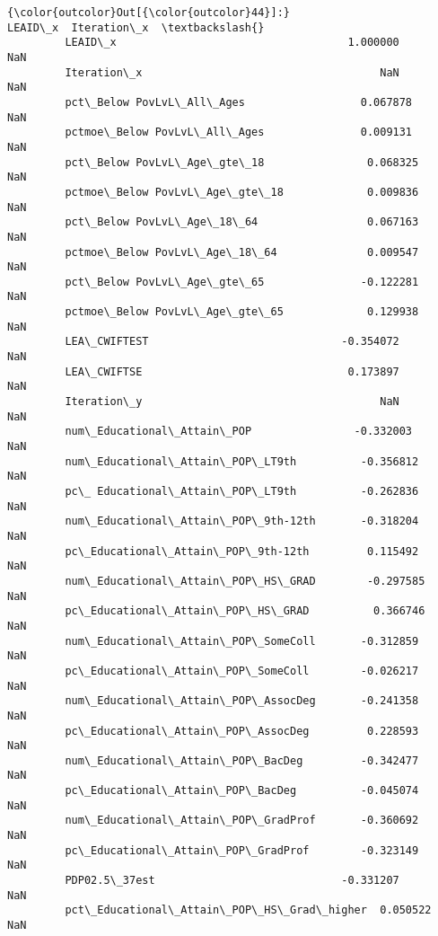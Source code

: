 \documentclass[11pt]{article}
\begin{document}
\begin{Verbatim}[commandchars=\\\{\}]
{\color{outcolor}Out[{\color{outcolor}44}]:}                                             LEAID\_x  Iteration\_x  \textbackslash{}
         LEAID\_x                                    1.000000          NaN   
         Iteration\_x                                     NaN          NaN   
         pct\_Below PovLvL\_All\_Ages                  0.067878          NaN   
         pctmoe\_Below PovLvL\_All\_Ages               0.009131          NaN   
         pct\_Below PovLvL\_Age\_gte\_18                0.068325          NaN   
         pctmoe\_Below PovLvL\_Age\_gte\_18             0.009836          NaN   
         pct\_Below PovLvL\_Age\_18\_64                 0.067163          NaN   
         pctmoe\_Below PovLvL\_Age\_18\_64              0.009547          NaN   
         pct\_Below PovLvL\_Age\_gte\_65               -0.122281          NaN   
         pctmoe\_Below PovLvL\_Age\_gte\_65             0.129938          NaN   
         LEA\_CWIFTEST                              -0.354072          NaN   
         LEA\_CWIFTSE                                0.173897          NaN   
         Iteration\_y                                     NaN          NaN   
         num\_Educational\_Attain\_POP                -0.332003          NaN   
         num\_Educational\_Attain\_POP\_LT9th          -0.356812          NaN   
         pc\_ Educational\_Attain\_POP\_LT9th          -0.262836          NaN   
         num\_Educational\_Attain\_POP\_9th-12th       -0.318204          NaN   
         pc\_Educational\_Attain\_POP\_9th-12th         0.115492          NaN   
         num\_Educational\_Attain\_POP\_HS\_GRAD        -0.297585          NaN   
         pc\_Educational\_Attain\_POP\_HS\_GRAD          0.366746          NaN   
         num\_Educational\_Attain\_POP\_SomeColl       -0.312859          NaN   
         pc\_Educational\_Attain\_POP\_SomeColl        -0.026217          NaN   
         num\_Educational\_Attain\_POP\_AssocDeg       -0.241358          NaN   
         pc\_Educational\_Attain\_POP\_AssocDeg         0.228593          NaN   
         num\_Educational\_Attain\_POP\_BacDeg         -0.342477          NaN   
         pc\_Educational\_Attain\_POP\_BacDeg          -0.045074          NaN   
         num\_Educational\_Attain\_POP\_GradProf       -0.360692          NaN   
         pc\_Educational\_Attain\_POP\_GradProf        -0.323149          NaN   
         PDP02.5\_37est                             -0.331207          NaN   
         pct\_Educational\_Attain\_POP\_HS\_Grad\_higher  0.050522          NaN   

\end{Verbatim}
\end{document}
